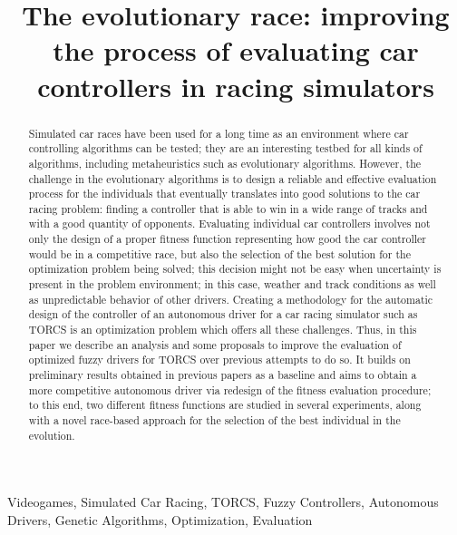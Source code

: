 \documentclass[conference]{IEEEtran}
\begin{document}
\title{The evolutionary race: improving the process of evaluating car
 controllers in racing simulators}

\author{
}

\maketitle

\begin{abstract}
Simulated car races have been used for a long time as an environment
where car controlling algorithms can be tested; they are an
interesting testbed for all kinds of algorithms, including
metaheuristics such as evolutionary algorithms. However, the challenge
in the evolutionary algorithms is to design a reliable and effective
evaluation process for the individuals that eventually translates into
good solutions to the car racing problem: finding a controller that is
able to win in a wide range of tracks and with a good quantity of
opponents. Evaluating individual car controllers involves not only the design of a proper fitness function representing how good the car controller would be in
a competitive race, but also the selection of the best solution for the
optimization problem being solved; this decision might not be
easy when uncertainty is present in the problem
environment; in this case, weather and track conditions as well as unpredictable
behavior of other drivers. 
Creating a methodology for the automatic design of  the controller of an
autonomous driver for a car racing simulator such as TORCS is an
optimization problem which offers all these challenges. Thus, in this
paper we describe an analysis and some proposals to improve the
evaluation of optimized fuzzy drivers for TORCS over previous attempts
to do so. It builds on preliminary results obtained in previous papers as a baseline and aims to obtain a more competitive autonomous driver via redesign of the fitness evaluation procedure; to this end, two different fitness functions are studied in several experiments, along with a novel race-based approach for the selection of the best individual in the evolution. 
\end{abstract}
\begin{IEEEkeywords}
Videogames, Simulated Car Racing, TORCS, Fuzzy Controllers, Autonomous Drivers, Genetic Algorithms, Optimization, Evaluation
\end{IEEEkeywords}
%
\end{document}

